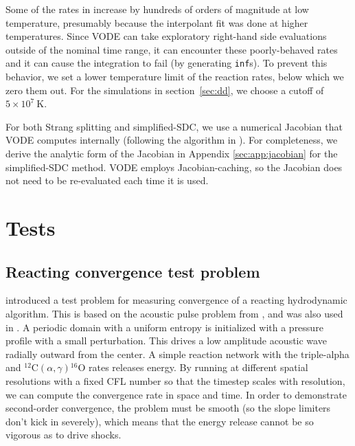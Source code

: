 \documentclass[linenumbers]{aastex631}
\newcommand{\isotm}[2]{{}^{#2}\mathrm{#1}}
\begin{document}
Some of the rates in \citet{reaclib} increase by hundreds of orders of
magnitude at low temperature, presumably because the interpolant fit was done at
higher temperatures.  Since VODE can take exploratory right-hand side evaluations
outside of the nominal time range, it can encounter these poorly-behaved rates
and it can cause the integration to fail (by generating {\tt inf}s).  To prevent
this behavior, we set a lower temperature limit of the reaction rates, below
which we zero them out.  For the simulations in section~\ref{sec:dd}, we choose a cutoff of
$5\times 10^7~\mathrm{K}$.


For both Strang splitting and simplified-SDC, we use a numerical Jacobian that VODE
computes internally (following the algorithm in \citealt{lsode}).  For
completeness, we derive the analytic form of the Jacobian in Appendix
\ref{sec:app:jacobian} for the simplified-SDC method. VODE employs
Jacobian-caching, so the Jacobian does not need to be re-evaluated each time it
is used.


\section{Tests}

\subsection{Reacting convergence test problem}

\citet{castro_sdc} introduced a test problem for measuring convergence
of a reacting hydrodynamic algorithm.  This is based on the acoustic
pulse problem from \citet{mccorquodalecolella}, and was also used in
\citet{strang_rnaas}.  A periodic domain with a uniform entropy is
initialized with a pressure profile with a small perturbation.  This
drives a low amplitude acoustic wave radially outward from the center.
A simple reaction network with the triple-alpha and
$\isotm{C}{12}(\alpha,\gamma)\isotm{O}{16}$ rates releases energy.  By
running at different spatial resolutions with a fixed CFL number so that the timestep scales
with resolution, we can compute the convergence rate in space and time.
In order to demonstrate second-order convergence, the problem must be smooth (so
the slope limiters don't kick in severely), which means that the
energy release cannot be so vigorous as to drive shocks.

\end{document}

